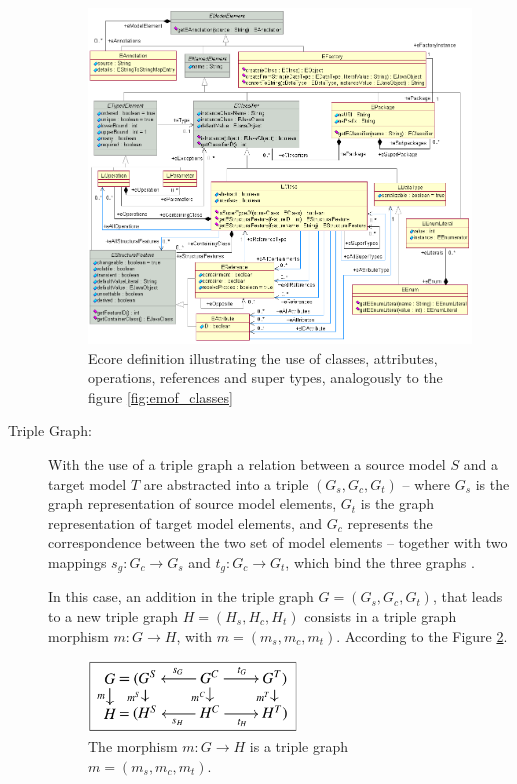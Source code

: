 \documentclass[tuberlin,cic,tc,english,noabntcite]{iiufrgs}
\begin{document}
\begin{description}
	\begin{figure}[H]
	    \caption{Ecore definition illustrating the use of classes, attributes, operations, references and super types, analogously to the figure \ref{fig:emof_classes}}
	    \begin{center}
	        \includegraphics[width=.7\textwidth]{ecore_relations}   
	    \end{center}
	    \label{fig:ecore_relations}
	\end{figure}

	\item[Triple Graph:] With the use of a triple graph a relation between a source model $S$ and a target model $T$ are abstracted into a triple $(G_s,G_c,G_t)$ – where $G_s$ is the graph representation of source model elements, $G_t$ is the graph representation of target model elements, and $G_c$ represents the correspondence between the two set of model elements – together with two mappings $s_g: G_c \rightarrow G_s$ and $t_g: G_c \rightarrow G_t$, which bind the three graphs \citep{hermann2011correctness}.
	
	In this case, an addition in the triple graph $G = (G_s,G_c,G_t)$, that leads to a new triple graph $H = (H_s,H_c,H_t)$ consists in a triple graph morphism $m: G \rightarrow H$, with $m = (m_s,m_c,m_t)$. According to the Figure \ref{fig:tg_morphism}.

	\begin{figure}[h]
	    \caption{The morphism $m: G \rightarrow H$ is a triple graph $m = (m_s,m_c,m_t)$.}
	    \begin{center}
	        \includegraphics[width=15em]{tg_morphism}   
	    \end{center}
	    \label{fig:tg_morphism}
	\end{figure}


\end{description}
\end{document}
